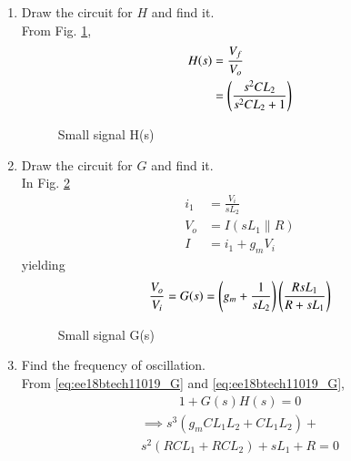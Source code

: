 \begin{enumerate}[label=\arabic*.,ref=\theenumi]
\item Draw the circuit for $H$ and find it.
\\
\solution From Fig. \ref{fig:ee18btech11019_fig7},
\begin{align}
H(s) &= \frac{V_f}{V_o}\\
&= \left(\frac{s^2CL_2}{s^2CL_2 +1}\right)
\label{eq:ee18btech11019_H}
\end{align}
\begin{figure}[!ht]
	\begin{center}
		\resizebox{\columnwidth}{!}{}
	\end{center}
\caption{Small signal H(s)}
\label{fig:ee18btech11019_fig7}
\end{figure}
%
\item Draw the circuit for $G$ and find it.
\\
\solution In Fig. \ref{fig:ee18btech11019_fig8}
%
\begin{align}
    i_1 &= \frac{V_i}{sL_2}
\\
    V_o &= I(sL_1\parallel R)\\
    I &= i_1 + g_mV_i
\end{align}
yielding
\begin{align}
    \frac{V_o}{V_i} = G(s) = \left(g_m + \frac{1}{sL_2}\right)\left(\frac{RsL_1}{R + sL_1}\right)
\label{eq:ee18btech11019_G}
\end{align}
\begin{figure}[!ht]
	\begin{center}
		\resizebox{\columnwidth}{!}{}
	\end{center}
\caption{Small signal G(s)}
\label{fig:ee18btech11019_fig8}
\end{figure}
\item Find the frequency of oscillation.
\\
\solution From \ref{eq:ee18btech11019_G} and \ref{eq:ee18btech11019_G},
%
\begin{align}
    1+G(s)H(s) = 0
\end{align}
\begin{multline}
\implies     s^3(g_mCL_1L_2 + CL_1L_2) +\\ s^2(RCL_1 + RCL_2) + sL_1 + R =0

\end{multline}
\end{enumerate}

